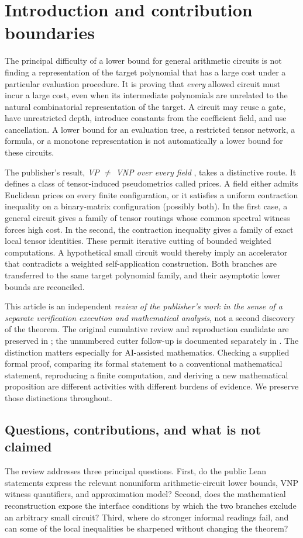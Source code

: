 \documentclass[11pt,letterpaper]{article}
\theoremstyle{definition}\newtheorem{definition}[theorem]{Definition}\newtheorem{example}[theorem]{Example}
\theoremstyle{remark}\newtheorem{remark}[theorem]{Remark}
\begin{document}
\section{Introduction and contribution boundaries}\label{sec:intro}
The principal difficulty of a lower bound for general arithmetic circuits is not finding a representation of the target polynomial that has a large cost under a particular evaluation procedure. It is proving that \emph{every} allowed circuit must incur a large cost, even when its intermediate polynomials are unrelated to the natural combinatorial representation of the target. A circuit may reuse a gate, have unrestricted depth, introduce constants from the coefficient field, and use cancellation. A lower bound for an evaluation tree, a restricted tensor network, a formula, or a monotone representation is not automatically a lower bound for these circuits.

The publisher's result, \emph{VP $\ne$ VNP over every field} \cite{claude}, takes a distinctive route. It defines a class of tensor-induced pseudometrics called prices. A field either admits Euclidean prices on every finite configuration, or it satisfies a uniform contraction inequality on a binary-matrix configuration (possibly both). In the first case, a general circuit gives a family of tensor routings whose common spectral witness forces high cost. In the second, the contraction inequality gives a family of exact local tensor identities. These permit iterative cutting of bounded weighted computations. A hypothetical small circuit would thereby imply an accelerator that contradicts a weighted self-application construction. Both branches are transferred to the same target polynomial family, and their asymptotic lower bounds are reconciled.

This article is an independent \emph{review of the publisher's work in the sense of a separate verification execution and mathematical analysis}, not a second discovery of the theorem. The original cumulative review and reproduction candidate are preserved in \cite{review,repro}; the unnumbered cutter follow-up is documented separately in \cite{j4}. The distinction matters especially for AI-assisted mathematics. Checking a supplied formal proof, comparing its formal statement to a conventional mathematical statement, reproducing a finite computation, and deriving a new mathematical proposition are different activities with different burdens of evidence. We preserve those distinctions throughout.

\subsection{Questions, contributions, and what is not claimed}
The review addresses three principal questions. First, do the public Lean statements express the relevant nonuniform arithmetic-circuit lower bounds, VNP witness quantifiers, and approximation model? Second, does the mathematical reconstruction expose the interface conditions by which the two branches exclude an arbitrary small circuit? Third, where do stronger informal readings fail, and can some of the local inequalities be sharpened without changing the theorem?
\end{document}
